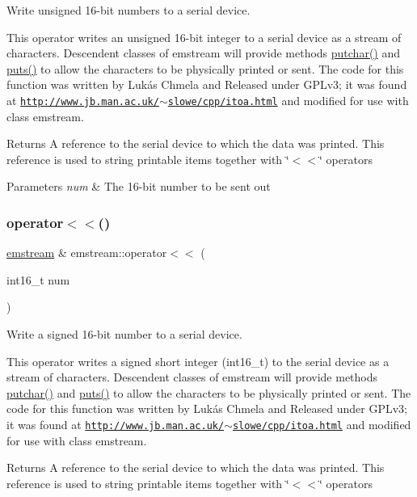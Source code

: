 Write unsigned 16-\/bit numbers to a serial device. 

This operator writes an unsigned 16-\/bit integer to a serial device as a stream of characters. Descendent classes of {\ttfamily emstream} will provide methods {\ttfamily \mbox{\hyperlink{classemstream_aa4dffc9aa58f601cc4153b4cbe65d757}{putchar()}}} and {\ttfamily \mbox{\hyperlink{classemstream_a1ad530cbebe6c54640c1db8c1b9afda2}{puts()}}} to allow the characters to be physically printed or sent. The code for this function was written by Lukás Chmela and Released under G\+P\+Lv3; it was found at \href{http://www.jb.man.ac.uk/~slowe/cpp/itoa.html}{\tt http\+://www.\+jb.\+man.\+ac.\+uk/$\sim$slowe/cpp/itoa.\+html} and modified for use with class {\ttfamily emstream}. \begin{DoxyReturn}{Returns}
A reference to the serial device to which the data was printed. This reference is used to string printable items together with \char`\"{}$<$$<$\char`\"{} operators 
\end{DoxyReturn}

\begin{DoxyParams}{Parameters}
{\em num} & The 16-\/bit number to be sent out \\
\hline
\end{DoxyParams}
\mbox{\label{classemstream_a40243877b820b91c9798e99fd565f85f}} 
\subsubsection{\texorpdfstring{operator$<$$<$()}{operator<<()}\hspace{0.1cm}{\footnotesize\ttfamily [6/14]}}
{\footnotesize\ttfamily \mbox{\hyperlink{classemstream}{emstream}} \& emstream\+::operator$<$$<$ (\begin{DoxyParamCaption}\item[{int16\+\_\+t}]{num }\end{DoxyParamCaption})}



Write a signed 16-\/bit number to a serial device. 

This operator writes a signed short integer ({\ttfamily int16\+\_\+t}) to the serial device as a stream of characters. Descendent classes of {\ttfamily emstream} will provide methods {\ttfamily \mbox{\hyperlink{classemstream_aa4dffc9aa58f601cc4153b4cbe65d757}{putchar()}}} and {\ttfamily \mbox{\hyperlink{classemstream_a1ad530cbebe6c54640c1db8c1b9afda2}{puts()}}} to allow the characters to be physically printed or sent. The code for this function was written by Lukás Chmela and Released under G\+P\+Lv3; it was found at \href{http://www.jb.man.ac.uk/~slowe/cpp/itoa.html}{\tt http\+://www.\+jb.\+man.\+ac.\+uk/$\sim$slowe/cpp/itoa.\+html} and modified for use with class {\ttfamily emstream}. \begin{DoxyReturn}{Returns}
A reference to the serial device to which the data was printed. This reference is used to string printable items together with \char`\"{}$<$$<$\char`\"{} operators 
\end{DoxyReturn}

